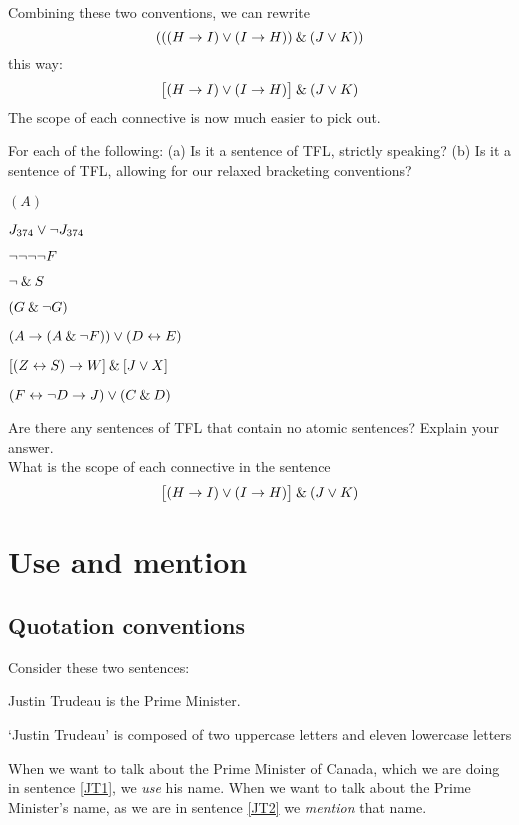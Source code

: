 Combining these two conventions, we can rewrite 
$$(((H \rightarrow I) \vee (I \rightarrow H)) \mathbin{\&} (J \vee K))$$
this way:
$$\bigl[(H \rightarrow I) \vee (I \rightarrow H)\bigr] \mathbin{\&} (J \vee K)$$
The scope of each connective is now much easier to pick out.

\practiceproblems

\solutions
\problempart
\label{pr.wiffTFL}
For each of the following: (a) Is it a sentence of TFL, strictly speaking? (b) Is it a sentence of TFL, allowing for our relaxed bracketing conventions?
\begin{earg}
\item $(A)$
\item $J_{374} \vee {\neg} J_{374}$
\item ${\neg} {\neg} {\neg} {\neg} F$
\item ${\neg} \mathbin{\&} S$
\item $(G \mathbin{\&} {\neg} G)$
\item $(A \rightarrow (A \mathbin{\&} {\neg} F)) \vee (D \leftrightarrow E)$
\item $[(Z \leftrightarrow S) \rightarrow W] \mathbin{\&} [J \vee X]$
\item $(F \leftrightarrow {\neg} D \rightarrow J) \vee (C \mathbin{\&} D)$
\end{earg}

\problempart
Are there any sentences of TFL that contain no atomic sentences? Explain your answer.\\

\problempart
What is the scope of each connective in the sentence
$$\bigl[(H \rightarrow I) \vee (I \rightarrow H)\bigr] \mathbin{\&} (J \vee K)$$


\chapter{Use and mention}\label{s:UseMention}

\section{Quotation conventions}
Consider these two sentences:
	\begin{earg}
		\item[\ex{JT1}] Justin Trudeau is the Prime Minister.
		\item[\ex{JT2}] `Justin Trudeau' is composed of two uppercase letters and eleven lowercase letters
	\end{earg}
When we want to talk about the Prime Minister of Canada, which we are doing in sentence \ref{JT1}, we \textit{use} his name. When we want to talk about the Prime Minister's name, as we are in sentence \ref{JT2} we \emph{mention} that name.

